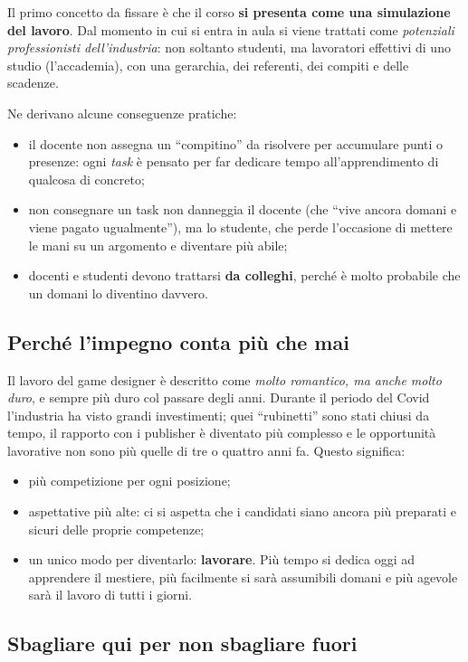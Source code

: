 Il primo concetto da fissare è che il corso \textbf{si presenta come una
simulazione del lavoro}. Dal momento in cui si entra in aula si viene trattati
come \emph{potenziali professionisti dell'industria}: non soltanto studenti,
ma lavoratori effettivi di uno studio (l'accademia), con una gerarchia, dei
referenti, dei compiti e delle scadenze.

Ne derivano alcune conseguenze pratiche:
\begin{itemize}
  \item il docente non assegna un ``compitino'' da risolvere per accumulare
        punti o presenze: ogni \emph{task} è pensato per far dedicare tempo
        all'apprendimento di qualcosa di concreto;
  \item non consegnare un task non danneggia il docente (che ``vive ancora
        domani e viene pagato ugualmente''), ma lo studente, che perde
        l'occasione di mettere le mani su un argomento e diventare più abile;
  \item docenti e studenti devono trattarsi \textbf{da colleghi}, perché è
        molto probabile che un domani lo diventino davvero.
\end{itemize}

\subsection{Perché l'impegno conta più che mai}

Il lavoro del game designer è descritto come \emph{molto romantico, ma anche
molto duro}, e sempre più duro col passare degli anni. Durante il periodo del
Covid l'industria ha visto grandi investimenti; quei ``rubinetti'' sono stati
chiusi da tempo, il rapporto con i publisher è diventato più complesso e le
opportunità lavorative non sono più quelle di tre o quattro anni fa. Questo
significa:
\begin{itemize}
  \item più competizione per ogni posizione;
  \item aspettative più alte: ci si aspetta che i candidati siano ancora più
        preparati e sicuri delle proprie competenze;
  \item un unico modo per diventarlo: \textbf{lavorare}. Più tempo si dedica
        oggi ad apprendere il mestiere, più facilmente si sarà assumibili
        domani e più agevole sarà il lavoro di tutti i giorni.
\end{itemize}

\subsection{Sbagliare qui per non sbagliare fuori}

